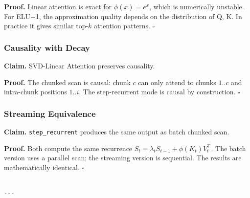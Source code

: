 \textbf{Proof.} Linear attention is exact for $\phi(x) = e^x$, which is 
numerically unstable. For ELU+1, the approximation quality depends on the 
distribution of Q, K. In practice it gives similar top-$k$ attention patterns. $\square$

\subsubsection{Causality with Decay}

\textbf{Claim.} SVD-Linear Attention preserves causality.

\textbf{Proof.} The chunked scan is causal: chunk $c$ can only attend to chunks 
$1..c$ and intra-chunk positions $1..i$. The step-recurrent mode is causal 
by construction. $\square$

\subsubsection{Streaming Equivalence}

\textbf{Claim.} \texttt{step\_recurrent} produces the same output as batch chunked scan.

\textbf{Proof.} Both compute the same recurrence $S_t = \lambda_t S_{t-1} + \phi(K_t) V_t^\top$. 
The batch version uses a parallel scan; the streaming version is sequential. 
The results are mathematically identical. $\square$
\begin{lstlisting}

---
\end{lstlisting}